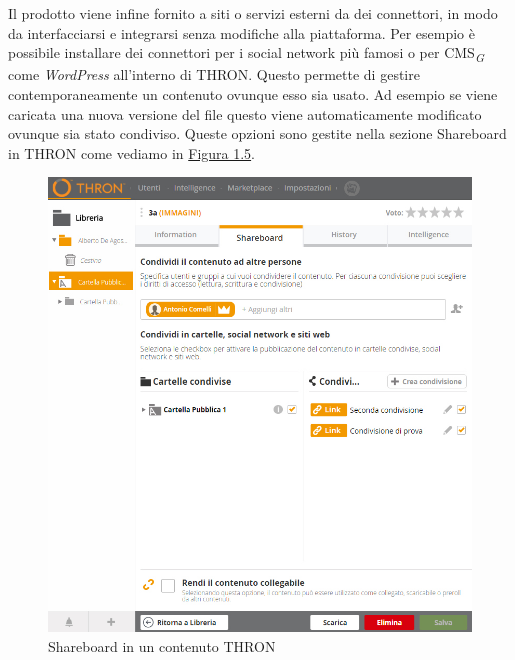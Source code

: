 \documentclass[a4paper, 12pt, twoside, openright]{book}
\newcommand{\gloss}[1]{#1\textsubscript{\textit{\tiny{G}}}}
\begin{document}
Il prodotto viene infine fornito a siti o servizi esterni da dei connettori, in modo da interfacciarsi e integrarsi senza modifiche alla piattaforma. Per esempio è possibile installare dei connettori per i social network più famosi o per \gloss{CMS} come \textit{WordPress} all'interno di THRON. Questo permette di gestire contemporaneamente un contenuto ovunque esso sia usato. Ad esempio se viene caricata una nuova versione del file questo viene automaticamente modificato ovunque sia stato condiviso. Queste opzioni sono gestite nella sezione Shareboard in THRON come vediamo in \hyperref[content-shareboard]{Figura 1.5}.\\ 
\begin{figure}[H]
	\centering
	\label{content-shareboard}
	\includegraphics[width=1.0\textwidth]{images/content-shareboard.jpg}
	\caption{Shareboard in un contenuto THRON}
\end{figure}
\end{document}
